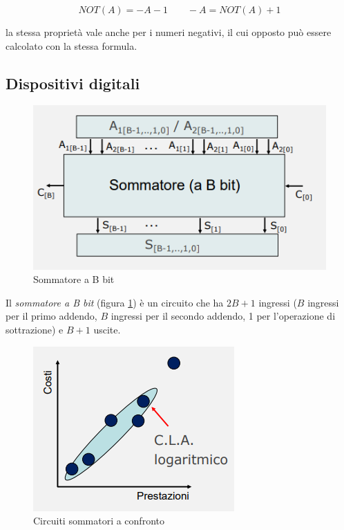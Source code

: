 \documentclass{article}
\begin{document}
\[NOT(A) = -A -1 \quad \quad -A = NOT(A) + 1\]

la stessa proprietà vale anche per i numeri negativi, il cui opposto può essere calcolato con la stessa formula.

\clearpage








\subsection{Dispositivi digitali}

\begin{figure}[h]
  \centering
  \includegraphics[scale=0.7]{IM_sommatore_B_bit}
  \caption{Sommatore a B bit}
  \label{sommatore_B_bit}
\end{figure}

Il \textit{sommatore a B bit} (figura \ref{sommatore_B_bit}) è un circuito che ha $2B + 1$ ingressi ($B$ ingressi per il primo addendo, $B$ ingressi per il secondo addendo, 1 per l'operazione di sottrazione) e $B + 1$ uscite.

\begin{figure}[h]
  \centering
  \includegraphics[scale=0.7]{IM_grafici_sommatori}
  \caption{Circuiti sommatori a confronto}
  \label{grafici_sommatori}
\end{figure}
\end{document}
